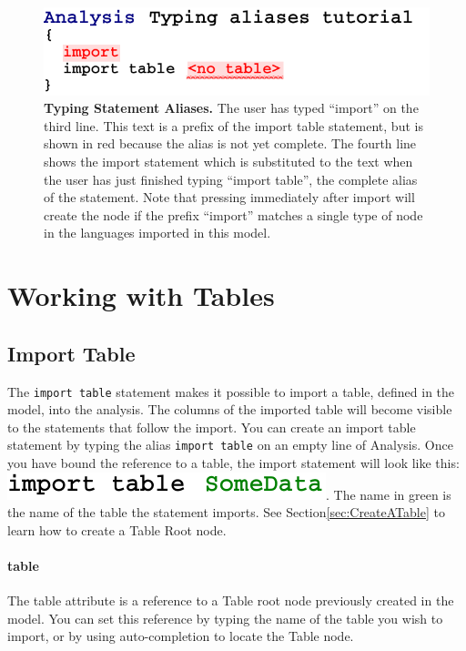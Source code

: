 \begin{figure}[h!tbp]
  \centering
  \includegraphics[width=\figWidthNarrow]{figures/AnalysisTypingAliases.pdf}
\caption[Typing Statement Aliases.]{\textbf{Typing Statement Aliases.} The user has typed ``import'' on the third line. This text is a prefix of the import table statement, but is shown in red because the alias is not yet complete. The fourth line shows the import statement which is substituted to the text when the user has just finished typing ``import table'', the complete alias of the statement. Note that pressing \keys{\return} immediately after import will create the node if the prefix ``import'' matches a single type of node in the languages imported in this model.}
\label{fig:TypingStatementAliases}
\end{figure}

\section{Working with Tables}

\subsection{Import Table}
The \texttt{import table} statement makes it possible to import a table, defined in the model, into the analysis. The columns of the imported table will become visible to the statements that follow the import. You can create an import table statement by typing the alias \texttt{import table} on an empty line of Analysis. Once you have bound the reference to a table, the import statement will look like this: \includegraphics[height=2ex]{figures/SomeDataImportTable.pdf}. The name in green is the name of the table the statement imports. See Section\ref{sec:CreateATable} to learn how to create a Table Root node.
\paragraph{table}

The table attribute is a reference to a Table root node previously created in the model. You can set this reference by typing the name of the table you wish to import, or by using auto-completion \keys{\ctrl+\space} to locate the Table node.

